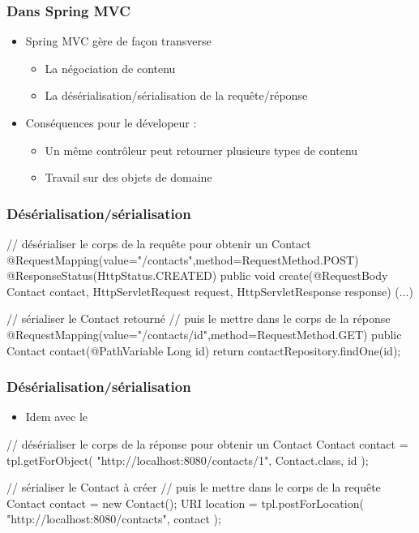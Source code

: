 \begin{frame}
 \frametitle{Dans Spring MVC}
 \begin{itemize}
  \item Spring MVC gère de façon transverse
  \begin{itemize}
   \item La négociation de contenu
   \item La désérialisation/sérialisation de la requête/réponse
  \end{itemize}
  \item Conséquences pour le dévelopeur :
  \begin{itemize}
   \item Un même contrôleur peut retourner plusieurs types de contenu
   \item Travail sur des objets de domaine
  \end{itemize}
 \end{itemize}

\end{frame}

\begin{frame}[fragile]
 \frametitle{Désérialisation/sérialisation}

 \begin{javacode}
// d\'es\'erialiser le corps de la requ\^ete pour obtenir un Contact
@RequestMapping(value="/contacts",method=RequestMethod.POST)
@ResponseStatus(HttpStatus.CREATED)
public void create(@RequestBody Contact contact,
                   HttpServletRequest request,
                   HttpServletResponse response) {
  (...)
}

// s\'erialiser le Contact retourn\'e
// puis le mettre dans le corps de la r\'eponse
@RequestMapping(value="/contacts/{id}",method=RequestMethod.GET)
public Contact contact(@PathVariable Long id) {
  return contactRepository.findOne(id);
}
 \end{javacode}

\end{frame}

\begin{frame}[fragile]
 \frametitle{Désérialisation/sérialisation}

 \begin{itemize}
  \item Idem avec le 
 \end{itemize}


 \begin{javacode}
// d\'es\'erialiser le corps de la r\'eponse pour obtenir un Contact
Contact contact = tpl.getForObject(
  "http://localhost:8080/contacts/1",
  Contact.class,
  id
);

// s\'erialiser le Contact \`a cr\'eer
// puis le mettre dans le corps de la requ\^ete
Contact contact = new Contact();
URI location = tpl.postForLocation(
  "http://localhost:8080/contacts",
  contact
);
 \end{javacode}

\end{frame}

